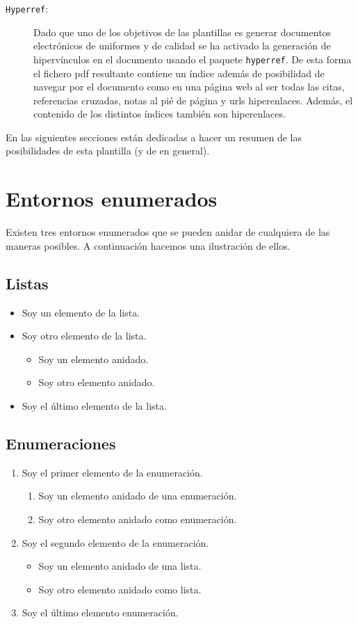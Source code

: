 \documentclass{DeustoFDP}
\begin{document}
\begin{description}
  \item[\texttt{Hyperref}:] Dado que uno de los objetivos de las plantillas es generar
    documentos electr\'onicos de uniformes y de calidad se ha activado la
    generaci\'on de hiperv\'inculos en el documento usando el paquete \texttt{hyperref}.
    De esta forma el fichero pdf resultante contiene un \'indice adem\'as de
    posibilidad de navegar por el documento como en una p\'agina web al
    ser todas las citas, referencias cruzadas, notas al pi\'e de p\'agina y urls
    hiperenlaces. Adem\'as, el contenido de los distintos \'indices tambi\'en
    son hiperenlaces.
\end{description}

En las siguientes secciones est\'an dedicadas a hacer un resumen de las
posibilidades de esta plantilla (y de  en general).

\section{Entornos enumerados}

Existen tres entornos enumerados que se pueden anidar de cualquiera de las
maneras posibles. A continuaci\'on hacemos una ilustraci\'on de ellos.

\subsection{Listas}
\begin{itemize}
  \item Soy un elemento de la lista.
  \item Soy otro elemento de la lista.
  \begin{itemize}
    \item Soy un elemento anidado.
    \item Soy otro elemento anidado.
  \end{itemize}
  \item Soy el \'ultimo elemento de la lista.
\end{itemize}

\subsection{Enumeraciones}
\begin{enumerate}
  \item Soy el primer elemento de la enumeraci\'on.
  \begin{enumerate}
    \item Soy un elemento anidado de una enumeraci\'on.
    \item Soy otro elemento anidado como enumeraci\'on.
  \end{enumerate}
  \item Soy el segundo elemento de la enumeraci\'on.
  \begin{itemize}
    \item Soy un elemento anidado de una lista.
    \item Soy otro elemento anidado como lista.
  \end{itemize}
  \item Soy el \'ultimo elemento enumeraci\'on.
\end{enumerate}
\end{document}
